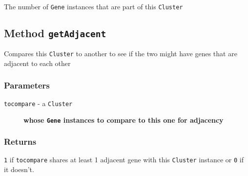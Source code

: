 The number of \texttt{Gene} instances that are part of this \texttt{Cluster}

\subsection*{Method \texttt{getAdjacent}\label{Method_getAdjacent}}


Compares this \texttt{Cluster} to another to see if the two might have genes that 
are adjacent to each other

\subsubsection*{Parameters\label{Parameters}}
\begin{description}

\item[{\texttt{tocompare} - a \texttt{Cluster}}] \textbf{whose \texttt{Gene} instances to compare to this one for adjacency}\end{description}
\subsubsection*{Returns\label{Returns}}


\texttt{1} if \texttt{tocompare} shares at least 1 adjacent gene with this \texttt{Cluster} instance or
\texttt{0} if it doesn't.
